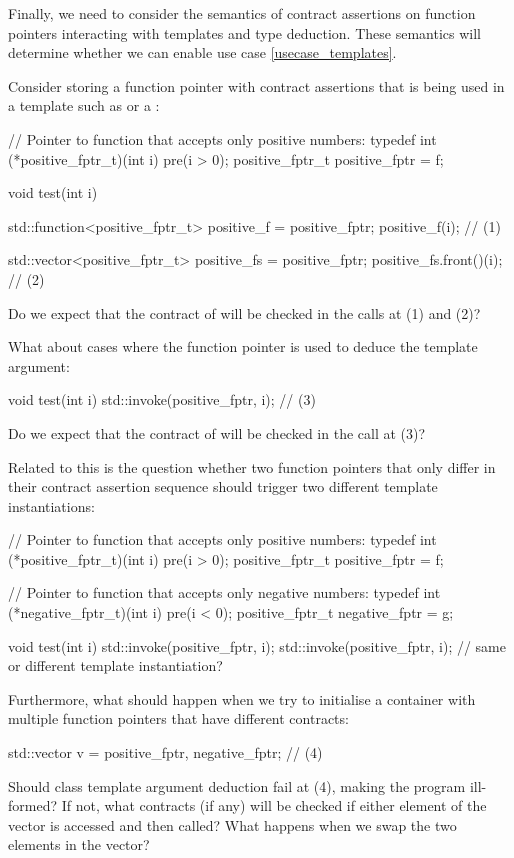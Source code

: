 Finally, we need to consider the semantics of contract assertions on function pointers interacting with templates and type deduction. These semantics will determine whether we can enable use case \ref{usecase_templates}.

Consider storing a function pointer with contract assertions that is being used in a template such as  or a :
\begin{codeblock}
// Pointer to function that accepts only positive numbers:
typedef int (*positive_fptr_t)(int i) pre(i > 0);
positive_fptr_t positive_fptr = f;

void test(int i) {
  std::function<positive_fptr_t> positive_f = positive_fptr;
  positive_f(i);  // (1)
  
  std::vector<positive_fptr_t> positive_fs = {positive_fptr};
  positive_fs.front()(i);  // (2)
}
\end{codeblock}
Do we expect that the contract of  will be checked in the calls at (1) and (2)?

What about cases where the function pointer is used to deduce the template argument:
\begin{codeblock}
void test(int i) {
  std::invoke(positive_fptr, i);  // (3)
}
\end{codeblock}
Do we expect that the contract of  will be checked in the call at (3)?

Related to this is the question whether two function pointers that only differ in their contract assertion sequence should trigger two different template instantiations:
\begin{codeblock}
// Pointer to function that accepts only positive numbers:
typedef int (*positive_fptr_t)(int i) pre(i > 0);
positive_fptr_t positive_fptr = f;

// Pointer to function that accepts only negative numbers:
typedef int (*negative_fptr_t)(int i) pre(i < 0);
positive_fptr_t negative_fptr = g;

void test(int i) {
  std::invoke(positive_fptr, i);
  std::invoke(positive_fptr, i);  // same or different template instantiation?
}
\end{codeblock}
Furthermore, what should happen when we try to initialise a container with multiple function pointers that have different contracts:
\begin{codeblock}
std::vector v = {positive_fptr, negative_fptr};  // (4)
\end{codeblock}
Should class template argument deduction fail at (4), making the program ill-formed? If not, what contracts (if any) will be checked if either element of the vector is accessed and then called? What happens when we swap the two elements in the vector?

